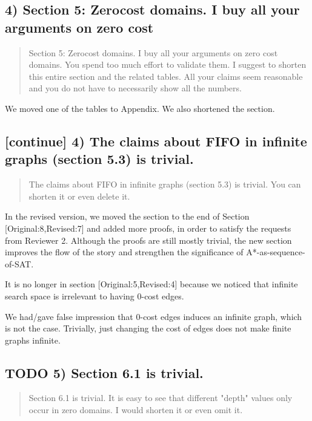 \documentclass{article}
\begin{document}
\subsection{4) Section 5: Zerocost domains. I buy all your arguments on zero cost}
\label{sec:orgheadline4}

\begin{quote}
Section 5: Zerocost domains. I buy all your arguments on zero cost
domains. You spend too much effort to validate them. I suggest to
shorten this entire section and the related tables. All your claims
seem reasonable and you do not have to necessarily show all the
numbers.
\end{quote}

We moved one of the tables to Appendix. We also shortened the section.

\subsection{[continue] 4)  The claims about FIFO in infinite graphs (section 5.3) is trivial.}
\label{sec:orgheadline5}

\begin{quote}
The claims about FIFO in infinite graphs (section 5.3) is trivial. You can shorten it or even delete it.
\end{quote}

In the revised version, we moved the section to the end of Section [Original:8,Revised:7]
and added more proofs, in order to satisfy the requests from Reviewer 2.
Although the proofs are still mostly trivial, the new section improves the flow of the story
and strengthen the significance of A*-as-sequence-of-SAT.

It is no longer in section [Original:5,Revised:4] because we noticed that
infinite search space is irrelevant to having 0-cost edges.

We had/gave false impression that 0-cost edges induces an infinite graph, which is not the case.
Trivially, just changing the cost of edges does not make finite graphs infinite.

\subsection{{\bfseries\sffamily TODO} 5) Section 6.1 is trivial.}
\label{sec:orgheadline6}

\begin{quote}
Section 6.1 is trivial. It is easy to see that different "depth"
values only occur in zero domains. I would shorten it or even omit it.
\end{quote}
\end{document}
